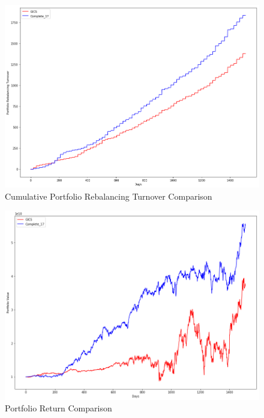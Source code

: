 \documentclass[../main.tex]{subfiles}
\begin{document}
\begin{figure}[H]
    \centering
    \includegraphics[scale=0.4]{images/port_rebal_compare.png}
    \caption{Cumulative Portfolio Rebalancing Turnover Comparison}
    \label{fig:benchmark_comparison:rebal_turnover_comparison}
\end{figure}

\begin{figure}[H]
    \centering
    \includegraphics[scale=0.4]{images/value_compare.png}
    \caption{Portfolio Return Comparison}
    \label{fig:benchmark_comparison:retuern_comparison}
\end{figure}
\end{document}
